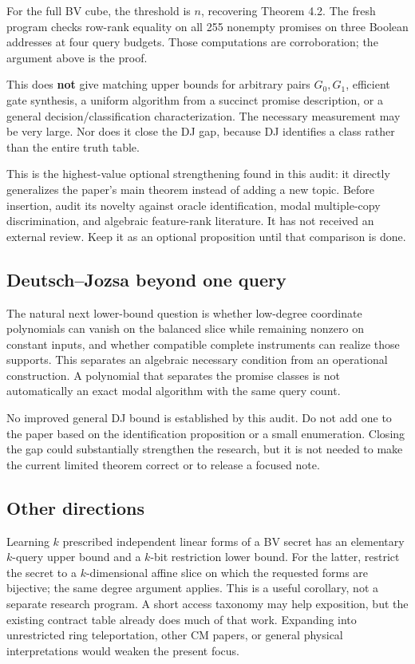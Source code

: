 \documentclass[
  11pt,
]{article}
\begin{document}
For the full BV cube, the threshold is \(n\), recovering Theorem 4.2.
The fresh program checks row-rank equality on all 255 nonempty promises
on three Boolean addresses at four query budgets. Those computations are
corroboration; the argument above is the proof.

This does \textbf{not} give matching upper bounds for arbitrary pairs
\(G_0,G_1\), efficient gate synthesis, a uniform algorithm from a
succinct promise description, or a general decision/classification
characterization. The necessary measurement may be very large. Nor does
it close the DJ gap, because DJ identifies a class rather than the
entire truth table.

This is the highest-value optional strengthening found in this audit: it
directly generalizes the paper's main theorem instead of adding a new
topic. Before insertion, audit its novelty against oracle
identification, modal multiple-copy discrimination, and algebraic
feature-rank literature. It has not received an external review. Keep it
as an optional proposition until that comparison is done.

\subsection{Deutsch--Jozsa beyond one
query}\label{deutschjozsa-beyond-one-query}

The natural next lower-bound question is whether low-degree coordinate
polynomials can vanish on the balanced slice while remaining nonzero on
constant inputs, and whether compatible complete instruments can realize
those supports. This separates an algebraic necessary condition from an
operational construction. A polynomial that separates the promise
classes is not automatically an exact modal algorithm with the same
query count.

No improved general DJ bound is established by this audit. Do not add
one to the paper based on the identification proposition or a small
enumeration. Closing the gap could substantially strengthen the
research, but it is not needed to make the current limited theorem
correct or to release a focused note.

\subsection{Other directions}\label{other-directions}

Learning \(k\) prescribed independent linear forms of a BV secret has an
elementary \(k\)-query upper bound and a \(k\)-bit restriction lower
bound. For the latter, restrict the secret to a \(k\)-dimensional affine
slice on which the requested forms are bijective; the same degree
argument applies. This is a useful corollary, not a separate research
program. A short access taxonomy may help exposition, but the existing
contract table already does much of that work. Expanding into
unrestricted ring teleportation, other CM papers, or general physical
interpretations would weaken the present focus.
\end{document}

